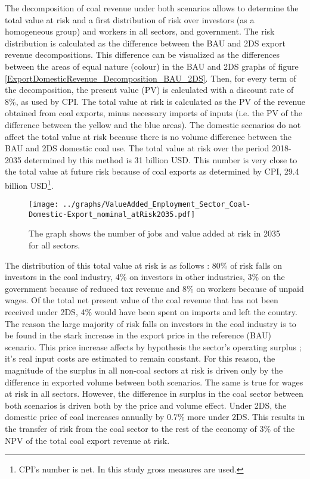 \documentclass[12pt,english]{article}
\begin{document}
The decomposition of coal revenue under both scenarios allows to determine the total value at risk and a first distribution of risk over investors (as a homogeneous group) and workers in all sectors, and government. The risk distribution is calculated as the difference between the BAU and 2DS export revenue decompositions. This difference can be visualized as the differences between the areas of equal nature (colour) in the BAU and 2DS graphs of figure \ref{ExportDomesticRevenue_Decomposition_BAU_2DS}. Then, for every term of the decomposition, the present value (PV) is calculated with a discount rate of 8\%, as used by CPI. The total value at risk is calculated as the PV of the revenue obtained from coal exports, minus necessary imports of inputs (i.e. the PV of the difference between the yellow and the blue areas). The domestic scenarios do not affect the total value at risk because there is no volume difference between the BAU and 2DS domestic coal use. The total value at risk over the period 2018-2035 determined by this method is 31 billion USD. This number is very close to the total value at future risk because of coal exports as determined by CPI, 29.4 billion USD\footnote{CPI's number is net. In this study gross measures are used.}.

\begin{figure}[!t]
	\centering
	\hspace{-10pt}\texttt{[image: ../graphs/ValueAdded\_Employment\_Sector\_Coal-Domestic-Export\_nominal\_atRisk2035.pdf]}
	\caption{\label{ValueAdded_Employment_Sector_Coal-Export_BAU_2DS}\small The graph shows the number of jobs and value added at risk in 2035 for all sectors.}
\end{figure}


The distribution of this total value at risk is as follows : 80\% of risk falls on investors in the coal industry, 4\% on investors in other industries, 3\% on the government because of reduced tax revenue and 8\% on workers because of unpaid wages. Of the total net present value of the coal revenue that has not been received under 2DS, 4\% would have been spent on imports and left the country. %
The reason the large majority of risk falls on investors in the coal industry is to be found in the stark increase in the export price in the reference (BAU) scenario. This price increase affects by hypothesis the sector's operating surplus ; it's real input costs are estimated to remain constant. For this reason, the magnitude of the surplus in all non-coal sectors at risk is driven only by the difference in exported volume between both scenarios. The same is true for wages at risk in all sectors. However, the difference in surplus in the coal sector between both scenarios is driven both by the price and volume effect.
Under 2DS, the domestic price of coal increases annually by 0.7\% more under 2DS. This results in the transfer of risk from the coal sector to the rest of the economy of 3\% of the NPV of the total coal export revenue at risk.
\end{document}
